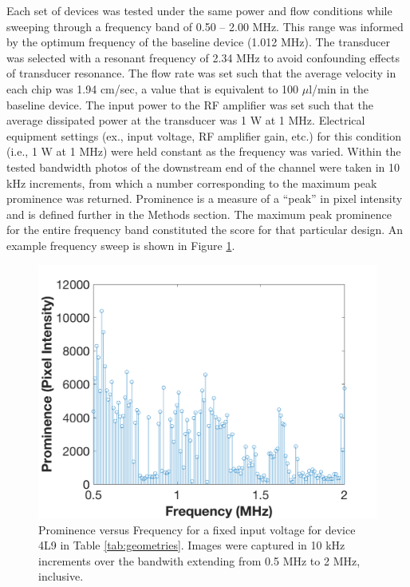 Each set of devices was tested under the same power and flow conditions while sweeping through a frequency band  of  0.50 -- 2.00 MHz.  This range was informed by the optimum frequency of the baseline device (1.012 MHz).  The transducer was selected with a resonant frequency of 2.34 MHz to avoid confounding effects of transducer resonance. The flow rate was set such that the average velocity in each chip was  1.94 cm/sec, a value that is equivalent to 100 $\mu$l/min in the baseline device. The input power to the RF amplifier was set such that the average dissipated power at the transducer was 1 W at 1 MHz. Electrical equipment settings (ex., input voltage, RF amplifier gain, etc.) for this condition (i.e., 1 W at 1 MHz) were held constant as the frequency was varied. Within the tested bandwidth photos of the downstream end of the channel were taken in 10 kHz increments, from which a number corresponding to the maximum peak prominence was returned.   Prominence is a measure of a ``peak'' in pixel intensity and is defined further in the Methods section. The maximum peak prominence for the entire frequency band constituted the score for that particular design. An example frequency sweep is shown in Figure \ref{fig:freqSweep}.


\begin{figure}[htb]
  \begin{minipage}[t]{0.99\linewidth}\centering
	\includegraphics[width=12cm]{freqSweep}
  \end{minipage}\hfill
	\caption[Prominence versus Frequency across swept bandwidth]{Prominence versus Frequency for a fixed input voltage for device 4L9 in Table \ref{tab:geometries}. Images were captured in 10 kHz increments over the bandwith extending from 0.5 MHz to 2 MHz, inclusive.}
	\label{fig:freqSweep}
\end{figure}

